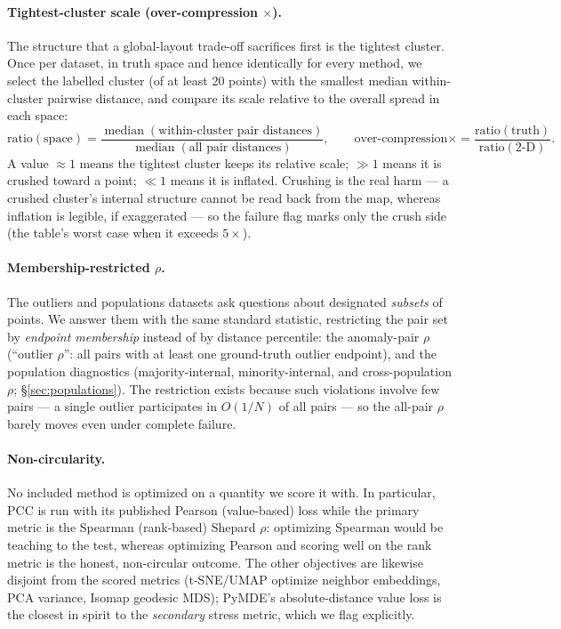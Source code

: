 \documentclass[11pt]{article}
\begin{document}
\paragraph{Tightest-cluster scale (over-compression $\times$).} The structure
that a global-layout trade-off sacrifices first is the tightest cluster. Once
per dataset, in truth space and hence identically for every method, we select
the labelled cluster (of at least 20 points) with the smallest median
within-cluster pairwise distance, and compare its scale relative to the
overall spread in each space:
\[
  \mathrm{ratio}(\text{space}) =
  \frac{\operatorname{median}(\text{within-cluster pair distances})}
       {\operatorname{median}(\text{all pair distances})},
  \qquad
  \text{over-compression} \times =
  \frac{\mathrm{ratio}(\text{truth})}{\mathrm{ratio}(\text{2-D})}.
\]
A value ${\approx}1$ means the tightest cluster keeps its relative scale;
${\gg}1$ means it is crushed toward a point; ${\ll}1$ means it is inflated.
Crushing is the real harm --- a crushed cluster's internal structure cannot
be read back from the map, whereas inflation is legible, if exaggerated ---
so the failure flag marks only the crush side (the table's worst case when it
exceeds $5\times$).

\paragraph{Membership-restricted $\rho$.} The outliers and populations
datasets ask questions about designated \emph{subsets} of points. We answer
them with the same standard statistic, restricting the pair set by
\emph{endpoint membership} instead of by distance percentile: the
anomaly-pair $\rho$ (``outlier $\rho$'': all pairs with at least one
ground-truth outlier endpoint), and the population diagnostics
(majority-internal, minority-internal, and cross-population $\rho$;
\S\ref{sec:populations}). The restriction exists because such violations
involve few pairs --- a single outlier participates in $O(1/N)$ of all
pairs --- so the all-pair $\rho$ barely moves even under complete failure.

\paragraph{Non-circularity.} No included method is optimized on a quantity we
score it with. In particular, PCC is run with its published Pearson
(value-based) loss \cite{pcc2025} while the primary metric is the Spearman
(rank-based) Shepard $\rho$: optimizing Spearman would be teaching to the
test, whereas optimizing Pearson and scoring well on the rank metric is the
honest, non-circular outcome. The other objectives are likewise disjoint from
the scored metrics (t-SNE/UMAP optimize neighbor embeddings, PCA variance,
Isomap geodesic MDS); PyMDE's absolute-distance value loss is the closest in
spirit to the \emph{secondary} stress metric, which we flag explicitly.
\end{document}
